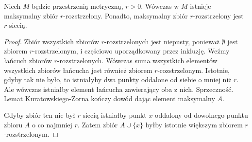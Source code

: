 \begin{lem} \label{lem:anti-net}
  Niech $M$ będzie przestrzenią metryczną, $r > 0$. Wówczas w $M$ istnieje maksymalny zbiór $r$-rozstrzelony. Ponadto, maksymalny zbiór $r$-rozstrzelony jest $r$-siecią.
  \begin{proof}
    Zbiór wszystkich zbiorów $r$-rozstrzelonych jest niepusty, ponieważ $\emptyset$ jest zbiorem $r$-rozstrzelonym, i częściowo uporządkowany przez inkluzję. Weźmy łańcuch zbiorów $r$-rozstrzelonych. Wówczas suma wszystkich elementów wszystkich zbiorów łańcucha jest również zbiorem $r$-rozstrzelonym. Istotnie, gdyby tak nie było, to istniałyby dwa punkty oddalone od siebie o mniej niż $r$. Ale wówczas istniałby element łańcucha zawierający oba z nich. Sprzeczność. Lemat Kuratowskiego-Zorna kończy dowód dając element maksymalny $A$.
    
    Gdyby zbiór ten nie był $r$-siecią istniałby punkt $x$ oddalony od dowolnego punktu zbioru $A$ o co najmniej $r$. Zatem zbiór $A \cup \{x\}$ byłby istotnie większym zbiorem $r$-rozstrzelonym.
  \end{proof}
\end{lem}

